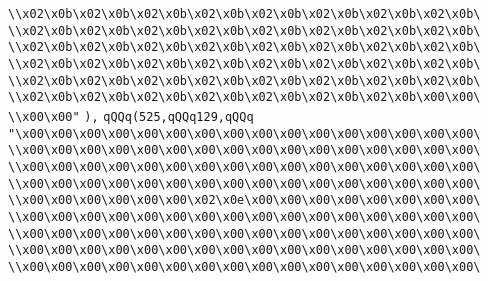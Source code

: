 \verb|\\x02\x0b\x02\x0b\x02\x0b\x02\x0b\x02\x0b\x02\x0b\x02\x0b\x02\x0b\|\newline
\verb|\\x02\x0b\x02\x0b\x02\x0b\x02\x0b\x02\x0b\x02\x0b\x02\x0b\x02\x0b\|\newline
\verb|\\x02\x0b\x02\x0b\x02\x0b\x02\x0b\x02\x0b\x02\x0b\x02\x0b\x02\x0b\|\newline
\verb|\\x02\x0b\x02\x0b\x02\x0b\x02\x0b\x02\x0b\x02\x0b\x02\x0b\x02\x0b\|\newline
\verb|\\x02\x0b\x02\x0b\x02\x0b\x02\x0b\x02\x0b\x02\x0b\x02\x0b\x02\x0b\|\newline
\verb|\\x02\x0b\x02\x0b\x02\x0b\x02\x0b\x02\x0b\x02\x0b\x02\x0b\x00\x00\|\newline
\verb|\\x00\x00"|\newline
\verb|),|\newline
\verb|qQQq(525,qQQq129,qQQq|\newline
\verb|"\x00\x00\x00\x00\x00\x00\x00\x00\x00\x00\x00\x00\x00\x00\x00\x00\|\newline
\verb|\\x00\x00\x00\x00\x00\x00\x00\x00\x00\x00\x00\x00\x00\x00\x00\x00\|\newline
\verb|\\x00\x00\x00\x00\x00\x00\x00\x00\x00\x00\x00\x00\x00\x00\x00\x00\|\newline
\verb|\\x00\x00\x00\x00\x00\x00\x00\x00\x00\x00\x00\x00\x00\x00\x00\x00\|\newline
\verb|\\x00\x00\x00\x00\x00\x00\x02\x0e\x00\x00\x00\x00\x00\x00\x00\x00\|\newline
\verb|\\x00\x00\x00\x00\x00\x00\x00\x00\x00\x00\x00\x00\x00\x00\x00\x00\|\newline
\verb|\\x00\x00\x00\x00\x00\x00\x00\x00\x00\x00\x00\x00\x00\x00\x00\x00\|\newline
\verb|\\x00\x00\x00\x00\x00\x00\x00\x00\x00\x00\x00\x00\x00\x00\x00\x00\|\newline
\verb|\\x00\x00\x00\x00\x00\x00\x00\x00\x00\x00\x00\x00\x00\x00\x00\x00\|\newline
